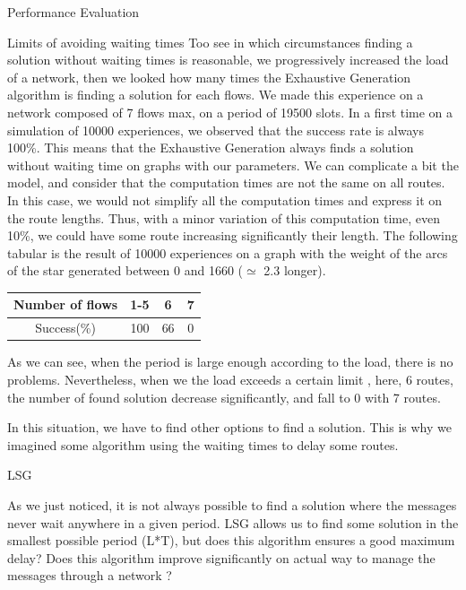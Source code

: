 \documentclass[a4paper,10pt]{report}
\begin{document}
\begin{chapter}{Performance Evaluation}
\begin{section}{Limits of avoiding waiting times}
Too see in which circumstances finding a solution without waiting times is reasonable, we progressively increased the load of a network,
then we looked how many times the Exhaustive Generation algorithm is finding a solution for each flows.
We made this experience on a network composed of 7 flows max, on a period of 19500 slots.
In a first time on a simulation of 10000 experiences, we observed that the success rate is always 100\%. This means that the Exhaustive Generation always finds a solution without waiting time on graphs with our parameters.
We can complicate a bit the model, and consider that the computation times are not the same on all routes. 
In this case, we would not simplify all the computation times and express it on the route lengths.
Thus, with a minor variation of this computation time, even 10\%, we could have some route increasing significantly their length. 
The following tabular is the result of 10000 experiences on a graph with the weight of the arcs of the star generated between 0 and 1660 ($\simeq$ 2.3 longer).

 \centering
  \begin{tabular}{|c|c|c|c|}
  \hline
   Number of flows & 1-5 & 6 & 7\\
   \hline
   Success(\%) & 100 & 66 & 0\\
   \hline
   \end{tabular}
   
   
As we can see, when the period is large enough according to the load, there is no problems. Nevertheless, when we the load exceeds a certain limit 
, here, 6 routes, the number of found solution decrease significantly, and fall to 0 with 7 routes.

In this situation, we have to find other options to find a solution. This is why we imagined some algorithm using the waiting times to delay some routes.

\end{section}

\begin{section}{LSG}

As we just noticed, it is not always possible to find a solution where the messages never wait anywhere in a given period.
LSG allows us to find some solution in the smallest possible period (L*T), but does this algorithm ensures a good maximum delay?
Does this algorithm improve significantly on actual way to manage the messages through a network ?


\end{section}
\end{chapter}
\end{document}
